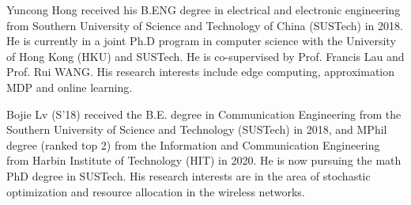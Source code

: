 
\vspace{-0.3cm}
\begin{IEEEbiography}{Yuncong Hong}
    received his B.ENG degree in electrical and electronic engineering from Southern University of Science and Technology of China (SUSTech) in 2018. He is currently in a joint Ph.D program in computer science with the University of Hong Kong (HKU) and SUSTech. He is co-supervised by Prof. Francis Lau and Prof. Rui WANG. His research interests include edge computing, approximation MDP and online learning.
\end{IEEEbiography}
\vspace{-1cm}

\begin{IEEEbiography}{Bojie Lv}
    (S'18) received the B.E. degree in Communication Engineering from the Southern University of Science and Technology (SUSTech) in 2018, and MPhil degree (ranked top 2) from the Information and Communication Engineering from Harbin Institute of Technology (HIT) in 2020. He is now pursuing the math PhD degree in SUSTech. His research interests are in the area of stochastic optimization and resource allocation in the wireless networks.
\end{IEEEbiography}
\vspace{-1cm}


